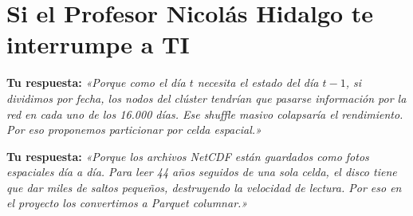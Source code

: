 \documentclass[12pt,a4paper]{article}
\begin{document}
\vspace{0.4cm}

\section{Si el Profesor Nicolás Hidalgo te interrumpe a TI}

\begin{defensebox}
\textbf{Tu respuesta:}  
\textit{«Porque como el día $t$ necesita el estado del día $t-1$, si dividimos por fecha, los nodos del clúster tendrían que pasarse información por la red en cada uno de los 16.000 días. Ese shuffle masivo colapsaría el rendimiento. Por eso proponemos particionar por celda espacial.»}
\end{defensebox}

\begin{defensebox}
\textbf{Tu respuesta:}  
\textit{«Porque los archivos NetCDF están guardados como fotos espaciales día a día. Para leer 44 años seguidos de una sola celda, el disco tiene que dar miles de saltos pequeños, destruyendo la velocidad de lectura. Por eso en el proyecto los convertimos a Parquet columnar.»}
\end{defensebox}
\end{document}
